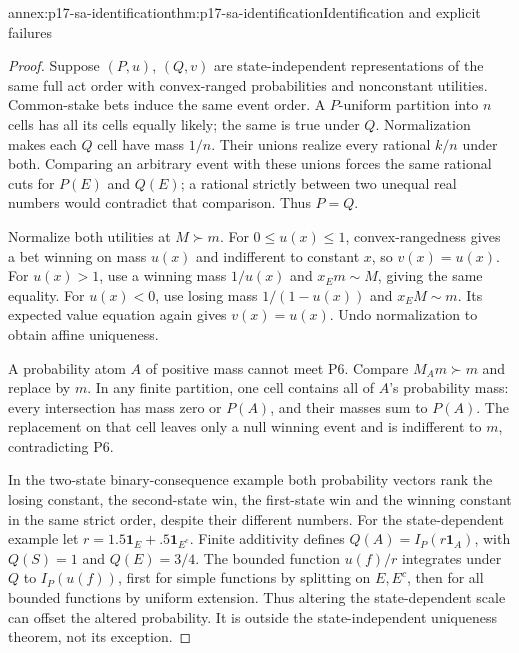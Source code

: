 \begin{annexitem}{annex:p17-sa-identification}{thm:p17-sa-identification}{Identification and explicit failures}
\begin{proof}
Suppose \((P,u)\), \((Q,v)\) are state-independent
representations of the same full act order with convex-ranged
probabilities and nonconstant utilities.
Common-stake bets induce the same event order.
A \(P\)-uniform partition into \(n\) cells has all its
cells equally likely; the same is true under \(Q\).
Normalization makes each \(Q\) cell have mass \(1/n\).
Their unions realize every rational \(k/n\) under both.
Comparing an arbitrary event with these unions forces
the same rational cuts for \(P(E)\) and \(Q(E)\);
a rational strictly between two unequal real numbers would
contradict that comparison. Thus \(P=Q\).

Normalize both utilities at \(M\succ m\).
For \(0\leq u(x)\leq1\), convex-rangedness gives a bet
winning on mass \(u(x)\) and indifferent to constant \(x\),
so \(v(x)=u(x)\).
For \(u(x)>1\), use a winning mass \(1/u(x)\) and
\(x_Em\sim M\), giving the same equality.
For \(u(x)<0\), use losing mass \(1/(1-u(x))\) and
\(x_EM\sim m\). Its expected value equation again gives
\(v(x)=u(x)\). Undo normalization to obtain affine uniqueness.

A probability atom \(A\) of positive mass cannot meet P6.
Compare \(M_Am\succ m\) and replace by \(m\).
In any finite partition, one cell contains all of \(A\)'s
probability mass: every intersection has mass zero or
\(P(A)\), and their masses sum to \(P(A)\).
The replacement on that cell leaves only a null winning
event and is indifferent to \(m\), contradicting P6.

In the two-state binary-consequence example both probability
vectors rank the losing constant, the second-state win,
the first-state win and the winning constant in the same
strict order, despite their different numbers.
For the state-dependent example let
\(r=1.5\mathbf1_E+.5\mathbf1_{E^c}\).
Finite additivity defines \(Q(A)=I_P(r\mathbf1_A)\),
with \(Q(S)=1\) and \(Q(E)=3/4\).
The bounded function \(u(f)/r\) integrates under \(Q\)
to \(I_P(u(f))\), first for simple functions by splitting
on \(E,E^c\), then for all bounded functions by uniform
extension. Thus altering the state-dependent scale can
offset the altered probability. It is outside the
state-independent uniqueness theorem, not its exception.
\end{proof}
\end{annexitem}
